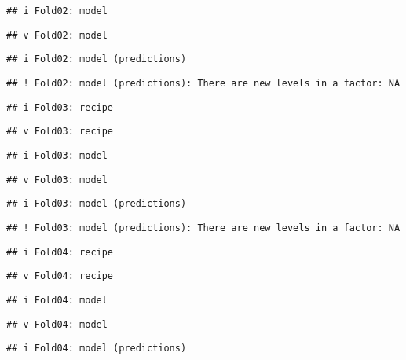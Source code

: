 \documentclass[
]{article}
\begin{document}
\begin{verbatim}
## i Fold02: model
\end{verbatim}

\begin{verbatim}
## v Fold02: model
\end{verbatim}

\begin{verbatim}
## i Fold02: model (predictions)
\end{verbatim}

\begin{verbatim}
## ! Fold02: model (predictions): There are new levels in a factor: NA
\end{verbatim}

\begin{verbatim}
## i Fold03: recipe
\end{verbatim}

\begin{verbatim}
## v Fold03: recipe
\end{verbatim}

\begin{verbatim}
## i Fold03: model
\end{verbatim}

\begin{verbatim}
## v Fold03: model
\end{verbatim}

\begin{verbatim}
## i Fold03: model (predictions)
\end{verbatim}

\begin{verbatim}
## ! Fold03: model (predictions): There are new levels in a factor: NA
\end{verbatim}

\begin{verbatim}
## i Fold04: recipe
\end{verbatim}

\begin{verbatim}
## v Fold04: recipe
\end{verbatim}

\begin{verbatim}
## i Fold04: model
\end{verbatim}

\begin{verbatim}
## v Fold04: model
\end{verbatim}

\begin{verbatim}
## i Fold04: model (predictions)
\end{verbatim}
\end{document}
